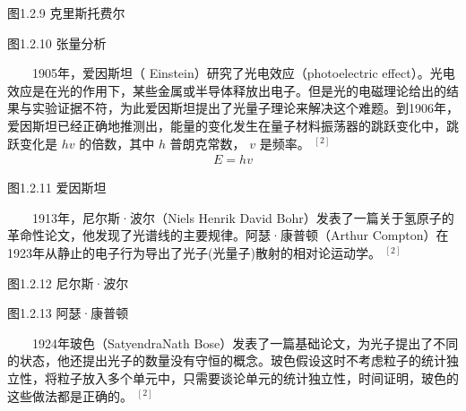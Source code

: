 \documentclass[a4paper,11pt,english]{sphinxmanual}
\begin{document}
\begin{center}图1.2.9 克里斯托费尔
\end{center}

\begin{center}图1.2.10 张量分析
\end{center}
\sphinxAtStartPar
  1905年，爱因斯坦（ Einstein）研究了光电效应（photoelectric effect）。光电效应是在光的作用下，某些金属或半导体释放出电子。但是光的电磁理论给出的结果与实验证据不符，为此爱因斯坦提出了光量子理论来解决这个难题。到1906年，爱因斯坦已经正确地推测出，能量的变化发生在量子材料振荡器的跳跃变化中，跳跃变化是 \(h{v}\) 的倍数，其中 \(h\) 普朗克常数， \(v\) 是频率。 \(^{[2]}\)
\begin{equation*}
\begin{split}E = hv\end{split}
\end{equation*}

\begin{center}图1.2.11 爱因斯坦
\end{center}
\sphinxAtStartPar
  1913年，尼尔斯·波尔（Niels Henrik David Bohr）发表了一篇关于氢原子的革命性论文，他发现了光谱线的主要规律。阿瑟·康普顿（Arthur Compton）在1923年从静止的电子行为导出了光子(光量子)散射的相对论运动学。 \(^{[2]}\)


\begin{center}图1.2.12 尼尔斯·波尔
\end{center}

\begin{center}图1.2.13 阿瑟·康普顿
\end{center}
\sphinxAtStartPar
  1924年玻色（SatyendraNath Bose）发表了一篇基础论文，为光子提出了不同的状态，他还提出光子的数量没有守恒的概念。玻色假设这时不考虑粒子的统计独立性，将粒子放入多个单元中，只需要谈论单元的统计独立性，时间证明，玻色的这些做法都是正确的。 \(^{[2]}\)
\end{document}
